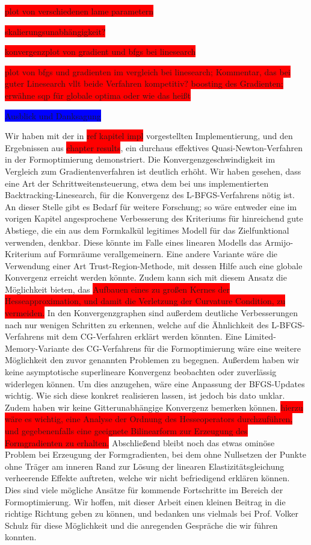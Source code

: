 \colorbox{red}{plot von verschiedenen lame parametern}

\colorbox{red}{skalierungsunabhängigkeit?}

\colorbox{red}{konvergenzplot von gradient und bfgs bei linesearch}

\colorbox{red}{plot von bfgs und gradienten im vergleich bei linesearch; Kommentar, das bei guter Linesearch vllt beide Verfahren kompetitiv? boosting des Gradienten; erwähne  sqp für globale optima oder wie das heißt}


\colorbox{blue}{Ausblick und Danksagung}

Wir haben mit der in \colorbox{red}{ref kapitel impl} vorgestellten Implementierung, und den Ergebnissen aus \colorbox{red}{chapter results}, ein durchaus effektives Quasi-Newton-Verfahren in der Formoptimierung demonstriert. 
Die Konvergenzgeschwindigkeit im Vergleich zum Gradientenverfahren ist deutlich erhöht. Wir haben gesehen, dass eine Art der Schrittweitensteuerung, etwa dem bei uns implementierten Backtracking-Linesearch, für die Konvergenz des L-BFGS-Verfahrens nötig ist. An dieser Stelle gibt es Bedarf für weitere Forschung; so wäre entweder eine im vorigen Kapitel angesprochene Verbesserung des Kriteriums für hinreichend gute Abstiege, die ein aus dem Formkalkül legitimes Modell für das Zielfunktional verwenden, denkbar. Diese könnte im Falle eines linearen Modells das Armijo-Kriterium auf Formräume verallgemeinern. Eine andere Variante wäre die Verwendung einer Art Trust-Region-Methode, mit dessen Hilfe auch eine globale Konvergenz erreicht werden könnte. Zudem kann sich mit diesem Ansatz die Möglichkeit bieten, das \colorbox{red}{Aufbauen eines zu großen Kernes der Hesseapproximation, und damit die Verletzung der Curvature Condition, zu vermeiden.} In den Konvergenzgraphen sind außerdem deutliche Verbesserungen nach nur wenigen Schritten zu erkennen, welche auf die Ähnlichkeit des L-BFGS-Verfahrens mit dem CG-Verfahren erklärt werden könnten. Eine Limited-Memory-Variante des CG-Verfahrens für die Formoptimierung wäre eine weitere Möglichkeit den zuvor genannten Problemen zu begegnen. Außerdem haben wir keine asymptotische superlineare Konvergenz beobachten oder zuverlässig widerlegen können. Um dies anzugehen, wäre eine Anpassung der BFGS-Updates wichtig. Wie sich diese konkret realisieren lassen, ist jedoch bis dato unklar. Zudem haben wir keine Gitterunabhängige Konvergenz bemerken können. \colorbox{red}{hierzu wäre es wichtig, eine Analyse der Ordnung des Hesseoperators durchzuführen, und gegebenenfalls eine geeignete Bilinearform zur Erzeugung des Formgradienten zu erhalten.} Abschließend bleibt noch das etwas ominöse Problem bei Erzeugung der Formgradienten, bei dem ohne Nullsetzen der Punkte ohne Träger am inneren Rand zur Lösung der linearen Elastizitätsgleichung verheerende Effekte auftreten, welche wir nicht befriedigend erklären können. Dies sind viele mögliche Ansätze für kommende  Fortschritte im Bereich der Formoptimierung. Wir hoffen, mit dieser Arbeit einen kleinen Beitrag in die richtige Richtung geben zu können, und bedanken uns vielmals bei Prof. Volker Schulz für diese Möglichkeit und die anregenden Gespräche die wir führen konnten.
\newpage
\nocite{*}




